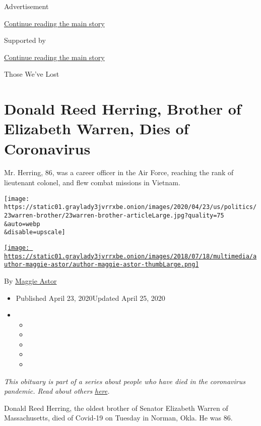 Advertisement

\protect\hyperlink{after-top}{Continue reading the main story}

Supported by

\protect\hyperlink{after-sponsor}{Continue reading the main story}

Those We've Lost

\hypertarget{donald-reed-herring-brother-of-elizabeth-warren-dies-of-coronavirus}{%
\section{Donald Reed Herring, Brother of Elizabeth Warren, Dies of
Coronavirus}\label{donald-reed-herring-brother-of-elizabeth-warren-dies-of-coronavirus}}

Mr. Herring, 86, was a career officer in the Air Force, reaching the
rank of lieutenant colonel, and flew combat missions in Vietnam.

\texttt{[image: https://static01.graylady3jvrrxbe.onion/images/2020/04/23/us/politics/23warren-brother/23warren-brother-articleLarge.jpg?quality=75\\\&auto=webp\\\&disable=upscale]}

\href{https://www.nytimes3xbfgragh.onion/by/maggie-astor}{\texttt{[image: https://static01.graylady3jvrrxbe.onion/images/2018/07/18/multimedia/author-maggie-astor/author-maggie-astor-thumbLarge.png]}}

By \href{https://www.nytimes3xbfgragh.onion/by/maggie-astor}{Maggie
Astor}

\begin{itemize}
\item
  Published April 23, 2020Updated April 25, 2020
\item
  \begin{itemize}
  \item
  \item
  \item
  \item
  \item
  \end{itemize}
\end{itemize}

\emph{This obituary is part of a series about people who have died in
the coronavirus pandemic. Read about others}
\href{https://www.nytimes3xbfgragh.onion/series/people-who-have-died-of-the-coronavirus}{\emph{here}}\emph{.}

Donald Reed Herring, the oldest brother of Senator Elizabeth Warren of
Massachusetts, died of Covid-19 on Tuesday in Norman, Okla. He was 86.

